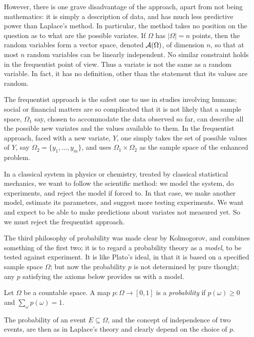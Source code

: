 However, there is one
grave disadvantage of the approach, apart from not being mathematics: it
is simply a description of data, and has much less predictive power than
Laplace's method. In particular, the method takes no position on the
question as to what are the possible variates. If
$\Omega$ has $|\Omega|=n$ points, then the random variables form a vector
space, denoted ${\cal A}(\Omega)$, of dimension $n$, so that at most $n$
random variables can
be linearly independent. No similar constraint holds in the frequentist
point of view. Thus a variate is not the same as a random variable.
In fact, it has no definition, other than the statement that its values are
random.

The frequentist approach is the safest one to use in studies
involving humans; social or financial matters are so complicated that
it is not likely that a sample space, $\Omega_1$ say, chosen to accommodate
the data observed so far, can describe all the possible new variates and the
values available to them. In the frequentist approach, faced with a new
variate, $Y$, one simply
takes the set of possible values of $Y$, say $\Omega_2=\{y_1,\ldots,y_m\}$,
and uses $\Omega_1\times\Omega_2$
as the sample space of the enhanced problem.

In a classical system in physics or chemistry, treated by classical
statistical mechanics, we want to follow the
scientific method: we model the system, do experiments, and
reject the model if forced to. In that case, we make another model,
estimate its parameters, and suggest more testing experiments.
We want and expect to be able to make predictions about variates not
measured yet. So we must reject the frequentist approach.

The third philosophy of probability \cite{Kolmogorov}was made clear by Kolmogorov, and
combines something of the first two;
it is to regard a probability theory as a {\em model}, to be tested
against experiment. It is like Plato's ideal, in that it
is based on a specified sample space $\Omega$;
but now the probability $p$ is not determined by
pure thought; any $p$ satisfying the axioms below provides us with a model.
\begin{definition}
Let $\Omega$ be a countable space.
A map $p:\Omega\rightarrow[0,1]$ is a {\em probability} if
$p(\omega)\geq0$ and $\sum_\omega p(\omega)=1$.
\label{probability}
\end{definition}
The probability of an event $E\subseteq\Omega$, and the concept of
independence of two events, are then as in Laplace's theory and clearly
depend on the choice of $p$.


